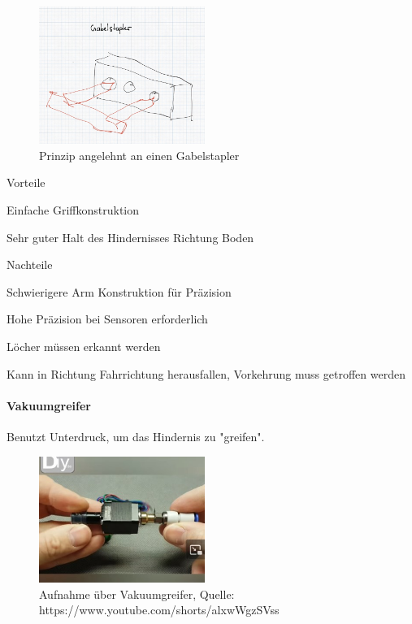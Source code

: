 \begin{figure}[h!]
        \centering
        \includegraphics[width=0.48\textwidth]{img/technologierecherche/Aufnahme/Gabelstapler.jpg}
        \caption{Prinzip angelehnt an einen Gabelstapler}
        \label{img:tech_Gaplerstapler}
\end{figure}

\begin{minipage}[t]{0.48\textwidth}
    \begin{items}
          \item [Vorteile]
          \item Einfache Griffkonstruktion
          \item Sehr guter Halt des Hindernisses Richtung Boden
    \end{items}
\end{minipage}
\hfill
\begin{minipage}[t]{0.48\textwidth}
    \begin{items}
          \item [Nachteile]
          \item Schwierigere Arm Konstruktion für Präzision
          \item Hohe Präzision bei Sensoren erforderlich
          \item Löcher müssen erkannt werden
          \item Kann in Richtung Fahrrichtung herausfallen, Vorkehrung muss getroffen werden
    \end{items}
\end{minipage}
\newpage
\paragraph{Vakuumgreifer}
Benutzt Unterdruck, um das Hindernis zu "greifen".

\begin{figure}[h!]
        \centering
        \includegraphics[width=0.48\textwidth]{img/technologierecherche/Aufnahme/Vakuumgreifer.jpg}
        \caption{Aufnahme über Vakuumgreifer, Quelle: https://www.youtube.com/shorts/alxwWgzSVss} 
        \label{img:tech_Vakuumgreifer}
\end{figure}

